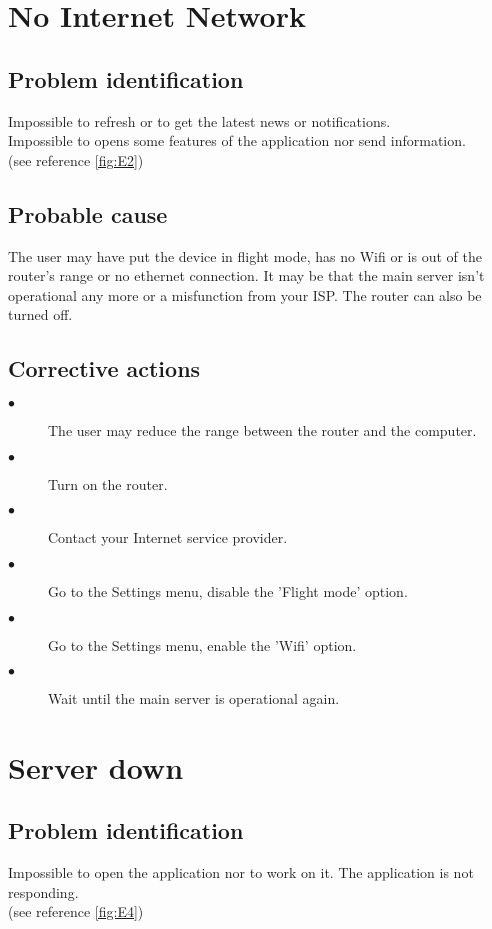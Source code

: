 \section{No Internet Network}

\subsection{Problem identification}
Impossible to refresh or to get the latest news or notifications.\\
Impossible to opens some features of the application nor send information.\\
(see reference \ref{fig:E2})\\

\subsection{Probable cause}
The user may have put the device in flight mode, has no Wifi or is out of the
router's range or no ethernet connection. It may be that the main server isn't
operational any more or a misfunction from your ISP. The router can also be
turned off.

\subsection{Corrective actions}
\begin{description} 
\item[$\bullet$] The user may reduce the range between the router and the
computer.
\item[$\bullet$] Turn on the router.
\item[$\bullet$] Contact your Internet service provider.
\item[$\bullet$] Go to the Settings menu, disable the 'Flight mode' option.
\item[$\bullet$] Go to the Settings menu, enable the 'Wifi' option.
\item[$\bullet$] Wait until the main server is operational again.
\end{description} 

\section{Server down}

\subsection{Problem identification}
Impossible to open the application nor to work on it. The application is not
responding.\\
(see reference \ref{fig:E4})\\

